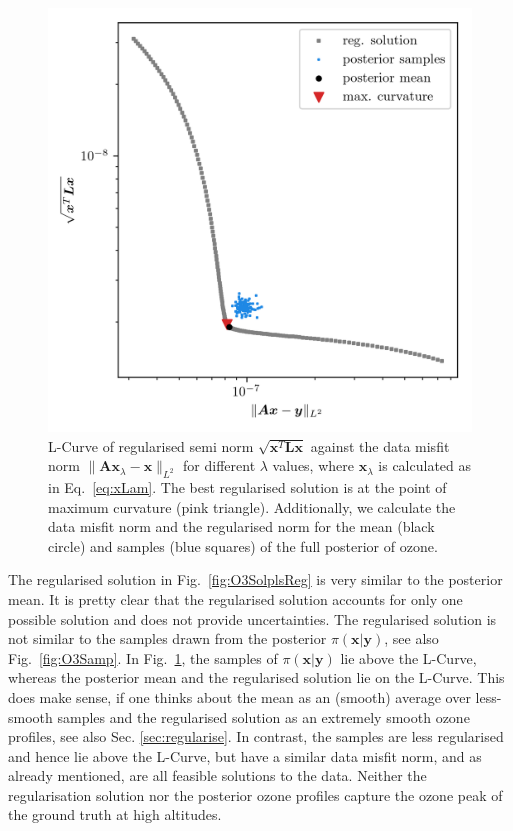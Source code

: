 \begin{figure}[ht!]
	\centering
	\includegraphics{LCurvePhD.png}
	\caption[Plot of the L-curve to find the regularised solution.]{L-Curve of regularised semi norm $\sqrt{\bm{x}^T\bm{Lx}}$ against the data misfit norm $\lVert \bm{A}\bm{x}_\lambda - \bm{x} \rVert_{L^2}$ for different $\lambda$ values, where $\bm{x}_{\lambda}$ is calculated as in Eq.~\ref{eq:xLam}. The best regularised solution is at the point of maximum curvature (pink triangle). Additionally, we calculate the data misfit norm and the regularised norm for the mean (black circle) and samples (blue squares) of the full posterior of ozone.}
	\label{fig:LCurve}
\end{figure}

The regularised solution in Fig.~\ref{fig:O3SolplsReg} is very similar to the posterior mean.
It is pretty clear that the regularised solution accounts for only one possible solution and does not provide uncertainties. The regularised solution is not similar to the samples drawn from the posterior $\pi(\bm{x}| \bm{y})$, see also Fig.~\ref{fig:O3Samp}.
In Fig.~\ref{fig:LCurve}, the samples of $\pi(\bm{x}| \bm{y})$ lie above the L-Curve, whereas the posterior mean and the regularised solution lie on the L-Curve.
This does make sense, if one thinks about the mean as an (smooth) average over less-smooth samples and the regularised solution as an extremely smooth ozone profiles, see also Sec. \ref{sec:regularise}.
In contrast, the samples are less regularised and hence lie above the L-Curve, but have a similar data misfit norm, and as already mentioned, are all feasible solutions to the data.
Neither the regularisation solution nor the posterior ozone profiles capture the ozone peak of the ground truth at high altitudes.
\clearpage

